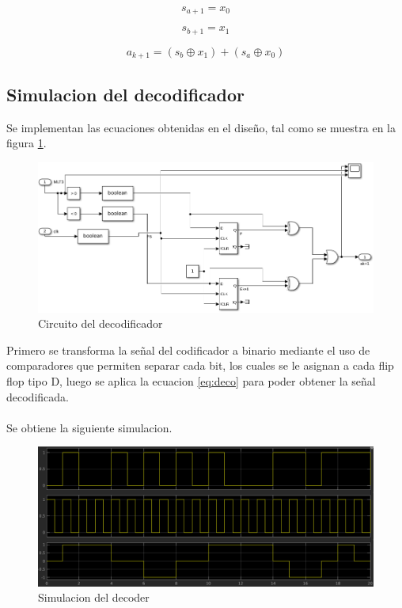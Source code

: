 \begin{equation*}
    s_{a+1}=x_0
\end{equation*}

\begin{equation*}
    s_{b+1}=x_1
\end{equation*}

\begin{equation}
    \label{eq:deco}
    a_{k+1} = (s_b\oplus x_1)+(s_a\oplus x_0)
\end{equation}

\subsection{Simulacion del decodificador}

Se implementan las ecuaciones obtenidas en el diseño, tal como se muestra en la figura \ref{decoSimu}.

\begin{figure}[H]
    \centering
    \includegraphics[width=1\textwidth]{laboratorioMLT3/imagenes/decoder.PNG}
    \caption{\label{decoSimu}Circuito del decodificador}
\end{figure}

Primero se transforma la señal del codificador a binario mediante el uso de comparadores que permiten separar cada bit, los cuales se le asignan a cada flip flop tipo D, luego se aplica la ecuacion \ref{eq:deco} para poder obtener la señal decodificada.\\
\\
Se obtiene la siguiente simulacion.

\begin{figure}[H]
    \centering
    \includegraphics[width=1\textwidth]{laboratorioMLT3/imagenes/simulacionDecoder.PNG}
    \caption{\label{}Simulacion del decoder}
\end{figure}

